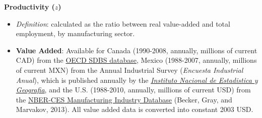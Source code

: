 \documentclass[11pt]{article}
\begin{document}
\begin{spacing}{1}
	
	

\noindent \textbf{Productivity ($z$)}
	\begin{itemize}
	
	\item \emph{Definition}: calculated as the ratio between real value-added and total employment, by manufacturing sector.
	
	\item \textbf{Value Added}:  Available for Canada (1990-2008, annually, millions of current CAD) from  the \href{http://stats.oecd.org/index.aspx?queryid=224}{OECD SDBS database}, Mexico (1988-2007, annually, millions of current MXN) from the Annual Industrial Survey (\emph{Encuesta Industrial Anual}), which is published annually by   the \href{http://buscador.inegi.org.mx/search?q=encuesta+industrial+anual&client=ProductosR&proxystylesheet=ProductosR&num=10&getfields=*&sort=meta:edicion:D:E:::D&entsp=a__inegi_politica_p72&lr=lang_es\%7Clang_en&oe=UTF-8&ie=UTF-8&ip=10.210.100.253&entqr=3&filter=0&site=ProductosBuscador&tlen=260&ulang=en&start=0}{\emph{Instituto Nacional de Estadistica y Geografia}}, and the U.S. (1988-2010, annually, millions of current USD) from  the \href{http://www.nber.org/nberces/}{NBER-CES Manufacturing Industry Database} (Becker, Gray, and Marvakov, 2013). All value added data is converted into constant 2003 USD.		
	

\end{itemize}
\end{spacing}
\end{document}
